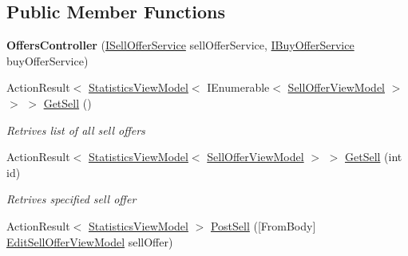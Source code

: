 \subsection*{Public Member Functions}
\begin{DoxyCompactItemize}
\item 
\mbox{\label{class_gielda_l2_1_1_a_p_i_1_1_controllers_1_1_offers_controller_aa6b3ebe08c35495c31e22354bf39f5e8}} 
{\bfseries Offers\+Controller} (\mbox{\hyperlink{interface_gielda_l2_1_1_i_n_f_r_a_s_t_r_u_c_t_u_r_e_1_1_interfaces_1_1_i_sell_offer_service}{I\+Sell\+Offer\+Service}} sell\+Offer\+Service, \mbox{\hyperlink{interface_gielda_l2_1_1_i_n_f_r_a_s_t_r_u_c_t_u_r_e_1_1_interfaces_1_1_i_buy_offer_service}{I\+Buy\+Offer\+Service}} buy\+Offer\+Service)
\item 
Action\+Result$<$ \mbox{\hyperlink{class_gielda_l2_1_1_a_p_i_1_1_view_models_1_1_view_1_1_statistics_view_model}{Statistics\+View\+Model}}$<$ I\+Enumerable$<$ \mbox{\hyperlink{class_gielda_l2_1_1_a_p_i_1_1_view_models_1_1_view_1_1_sell_offer_view_model}{Sell\+Offer\+View\+Model}} $>$ $>$ $>$ \mbox{\hyperlink{class_gielda_l2_1_1_a_p_i_1_1_controllers_1_1_offers_controller_a9ac2f421d868e7f0583c2b43368b5a28}{Get\+Sell}} ()
\begin{DoxyCompactList}\small\item\em Retrives list of all sell offers \end{DoxyCompactList}\item 
Action\+Result$<$ \mbox{\hyperlink{class_gielda_l2_1_1_a_p_i_1_1_view_models_1_1_view_1_1_statistics_view_model}{Statistics\+View\+Model}}$<$ \mbox{\hyperlink{class_gielda_l2_1_1_a_p_i_1_1_view_models_1_1_view_1_1_sell_offer_view_model}{Sell\+Offer\+View\+Model}} $>$ $>$ \mbox{\hyperlink{class_gielda_l2_1_1_a_p_i_1_1_controllers_1_1_offers_controller_a64df0f58d04d15edaa4630627838644b}{Get\+Sell}} (int id)
\begin{DoxyCompactList}\small\item\em Retrives specified sell offer \end{DoxyCompactList}\item 
Action\+Result$<$ \mbox{\hyperlink{class_gielda_l2_1_1_a_p_i_1_1_view_models_1_1_view_1_1_statistics_view_model}{Statistics\+View\+Model}} $>$ \mbox{\hyperlink{class_gielda_l2_1_1_a_p_i_1_1_controllers_1_1_offers_controller_a30bc8e1a4fcc81aa32fff84c054bfb3f}{Post\+Sell}} (\mbox{[}From\+Body\mbox{]} \mbox{\hyperlink{class_gielda_l2_1_1_a_p_i_1_1_view_models_1_1_edit_1_1_edit_sell_offer_view_model}{Edit\+Sell\+Offer\+View\+Model}} sell\+Offer)

\end{DoxyCompactItemize}
